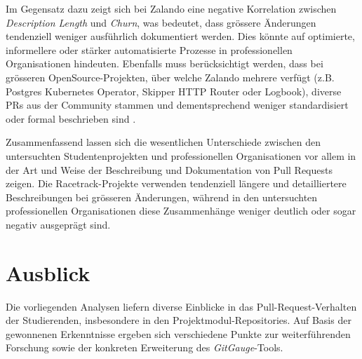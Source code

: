 Im Gegensatz dazu zeigt sich bei Zalando eine negative Korrelation zwischen \textit{Description Length} und \textit{Churn}, was bedeutet, dass grössere Änderungen tendenziell weniger ausführlich dokumentiert werden. Dies könnte auf optimierte, informellere oder stärker automatisierte Prozesse in professionellen Organisationen hindeuten. Ebenfalls muss berücksichtigt werden, dass bei grösseren OpenSource-Projekten, über welche Zalando mehrere verfügt (z.B. Postgres Kubernetes Operator, Skipper HTTP Router oder Logbook), diverse PRs aus der Community stammen und dementsprechend weniger standardisiert oder formal beschrieben sind \parencite{noauthor_zalandologbook_2025} \parencite{noauthor_zalandoskipper_2025} \parencite{noauthor_zalandopostgres-operator_2025}.

Zusammenfassend lassen sich die wesentlichen Unterschiede zwischen den untersuchten Studentenprojekten und professionellen Organisationen vor allem in der Art und Weise der Beschreibung und Dokumentation von Pull Requests zeigen. Die Racetrack-Projekte verwenden tendenziell längere und detailliertere Beschreibungen bei grösseren Änderungen, während in den untersuchten professionellen Organisationen diese Zusammenhänge weniger deutlich oder sogar negativ ausgeprägt sind.


\pagebreak
\section{Ausblick}
Die vorliegenden Analysen liefern diverse Einblicke in das Pull-Request-Verhalten der Studierenden, insbesondere in den Projektmodul-Repositories. 
Auf Basis der gewonnenen Erkenntnisse ergeben sich verschiedene Punkte zur weiterführenden Forschung sowie der konkreten Erweiterung des \textit{GitGauge}-Tools. 

